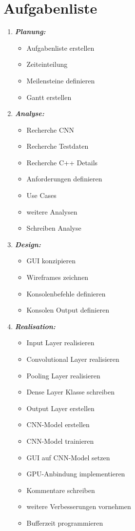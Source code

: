 \section{Aufgabenliste}
\label{sec:PlanungAufgabenliste}

\begin{enumerate}

\item \textbf{\emph{Planung:}}
\begin{itemize}
\item Aufgabenliste erstellen
\item Zeiteinteilung
\item Meilensteine definieren
\item Gantt erstellen
\end{itemize}

\item \textbf{\emph{Analyse:}}
\begin{itemize}
\item Recherche CNN
\item Recherche Testdaten
\item Recherche C++ Details
\item Anforderungen definieren
\item Use Cases
\item weitere Analysen
\item Schreiben Analyse
\end{itemize}

\item \textbf{\emph{Design:}}
\begin{itemize}
\item GUI konzipieren
\item Wireframes zeichnen
\item Konsolenbefehle definieren
\item Konsolen Output definieren
\end{itemize}

\item \textbf{\emph{Realisation:}}
\begin{itemize}
\item Input Layer realisieren
\item Convolutional Layer realisieren
\item Pooling Layer realisieren
\item Dense Layer Klasse schreiben
\item Output Layer erstellen
\item CNN-Model erstellen
\item CNN-Model trainieren
\item GUI auf CNN-Model setzen
\item GPU-Anbindung implementieren
\item Kommentare schreiben
\item weitere Verbesserungen vornehmen
\item Bufferzeit programmieren
\end{itemize}


\end{enumerate}
